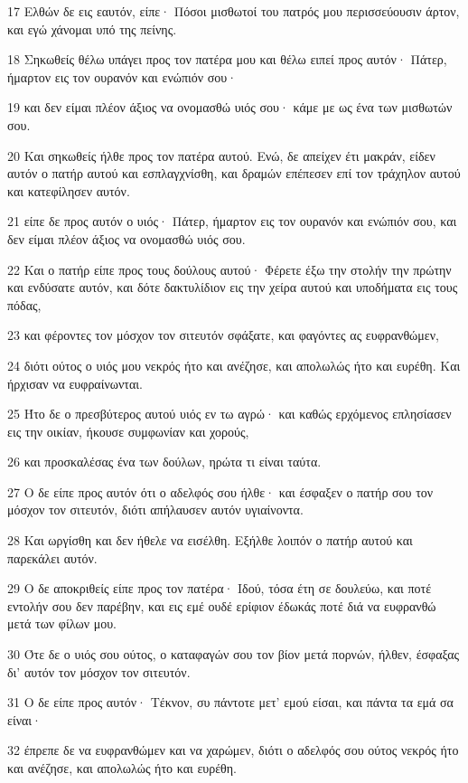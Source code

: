 \par 17 Ελθών δε εις εαυτόν, είπε· Πόσοι μισθωτοί του πατρός μου περισσεύουσιν άρτον, και εγώ χάνομαι υπό της πείνης.
\par 18 Σηκωθείς θέλω υπάγει προς τον πατέρα μου και θέλω ειπεί προς αυτόν· Πάτερ, ήμαρτον εις τον ουρανόν και ενώπιόν σου·
\par 19 και δεν είμαι πλέον άξιος να ονομασθώ υιός σου· κάμε με ως ένα των μισθωτών σου.
\par 20 Και σηκωθείς ήλθε προς τον πατέρα αυτού. Ενώ, δε απείχεν έτι μακράν, είδεν αυτόν ο πατήρ αυτού και εσπλαγχνίσθη, και δραμών επέπεσεν επί τον τράχηλον αυτού και κατεφίλησεν αυτόν.
\par 21 είπε δε προς αυτόν ο υιός· Πάτερ, ήμαρτον εις τον ουρανόν και ενώπιόν σου, και δεν είμαι πλέον άξιος να ονομασθώ υιός σου.
\par 22 Και ο πατήρ είπε προς τους δούλους αυτού· Φέρετε έξω την στολήν την πρώτην και ενδύσατε αυτόν, και δότε δακτυλίδιον εις την χείρα αυτού και υποδήματα εις τους πόδας,
\par 23 και φέροντες τον μόσχον τον σιτευτόν σφάξατε, και φαγόντες ας ευφρανθώμεν,
\par 24 διότι ούτος ο υιός μου νεκρός ήτο και ανέζησε, και απολωλώς ήτο και ευρέθη. Και ήρχισαν να ευφραίνωνται.
\par 25 Ήτο δε ο πρεσβύτερος αυτού υιός εν τω αγρώ· και καθώς ερχόμενος επλησίασεν εις την οικίαν, ήκουσε συμφωνίαν και χορούς,
\par 26 και προσκαλέσας ένα των δούλων, ηρώτα τι είναι ταύτα.
\par 27 Ο δε είπε προς αυτόν ότι ο αδελφός σου ήλθε· και έσφαξεν ο πατήρ σου τον μόσχον τον σιτευτόν, διότι απήλαυσεν αυτόν υγιαίνοντα.
\par 28 Και ωργίσθη και δεν ήθελε να εισέλθη. Εξήλθε λοιπόν ο πατήρ αυτού και παρεκάλει αυτόν.
\par 29 Ο δε αποκριθείς είπε προς τον πατέρα· Ιδού, τόσα έτη σε δουλεύω, και ποτέ εντολήν σου δεν παρέβην, και εις εμέ ουδέ ερίφιον έδωκάς ποτέ διά να ευφρανθώ μετά των φίλων μου.
\par 30 Ότε δε ο υιός σου ούτος, ο καταφαγών σου τον βίον μετά πορνών, ήλθεν, έσφαξας δι' αυτόν τον μόσχον τον σιτευτόν.
\par 31 Ο δε είπε προς αυτόν· Τέκνον, συ πάντοτε μετ' εμού είσαι, και πάντα τα εμά σα είναι·
\par 32 έπρεπε δε να ευφρανθώμεν και να χαρώμεν, διότι ο αδελφός σου ούτος νεκρός ήτο και ανέζησε, και απολωλώς ήτο και ευρέθη.

